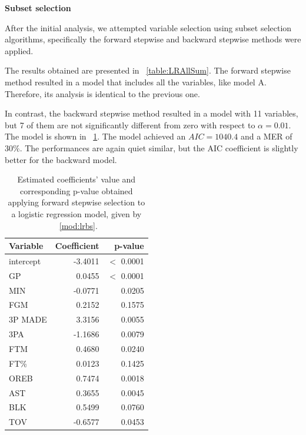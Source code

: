 \vspace{0.2cm}
\textbf{Subset selection}

After the initial analysis, we attempted variable selection using subset selection algorithms, specifically the forward stepwise and backward stepwise methods were applied. 

The results obtained are presented in \Tab~\ref{table:LRAllSum}. The forward stepwise method resulted in a model that includes all the variables, like model A. Therefore, its analysis is identical to the previous one.

In contrast, the backward stepwise method resulted in a model with 11 variables, but 7 of them are not significantly different from zero with respect to $\alpha = 0.01$. The model is shown in \Tab~\ref{table:LRBSSum}. The model achieved an $AIC = 1040.4$ and a MER of $30\%$. The performances are again quiet similar, but the AIC coefficient is slightly better for the backward model.

\begin{center}
\end{center}

\begin{table}[H]
	\centering
	\begin{tabular}{|| l | r | r ||} 
		\hline
		Variable & Coefficient & p-value \\
		\hline
		intercept & -3.4011 & $<$ 0.0001 \\
		GP & 0.0455 & $<$ 0.0001 \\
		MIN & -0.0771 & 0.0205 \\
		FGM & 0.2152 & 0.1575 \\
		3P MADE & 3.3156 & 0.0055 \\
		3PA & -1.1686 & 0.0079 \\
		FTM & 0.4680 & 0.0240 \\
		FT\% & 0.0123 & 0.1425 \\
		OREB & 0.7474 & 0.0018 \\
		AST & 0.3655 & 0.0045 \\
		BLK & 0.5499 & 0.0760 \\				
		TOV & -0.6577 & 0.0453 \\
		\hline
	\end{tabular}
	\caption{Estimated coefficients' value and corresponding p-value obtained applying forward stepwise selection to a logistic regression model, given by \Mod~\ref{mod:lrbs}.}
	\label{table:LRBSSum}
\end{table}

